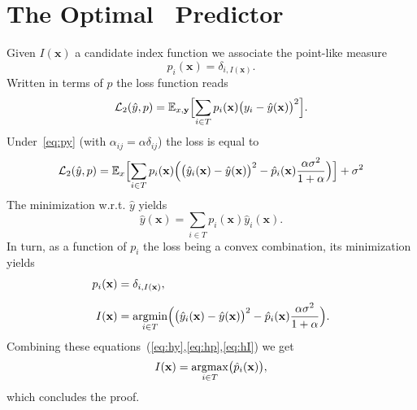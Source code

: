\chapter{The Optimal \XX \ Predictor}\label{app:opred}
Given $I(\mathbf{x})$ a candidate index function we associate the point-like measure
\[
p_i(\mathbf{x}) = \delta_{i,I(\mathbf{x})}.
\]
Written in terms of $p$ the loss function reads
\[
{\cal L}_2(\hat y,p) = {\mathbb E}_{x,{\bf y}}\Bigl[\sum_{i\in T} p_i(\mathbf{x})\bigl(y_i-\hat y(\mathbf{x})\bigr)^2\Bigr].
\]
Under~\cref{eq:py} (with $\alpha_{ij}=\alpha\delta_{ij}$) the loss is equal to
\[
{\cal L}_2(\hat y,p) = {\mathbb E}_x\Bigl[\sum_{i\in T} p_i(\mathbf{x})\Bigl( \bigl(\hat y_i(\mathbf{x})-\hat y(\mathbf{x})\bigr)^2-\hat p_i(\mathbf{x})\frac{\alpha\sigma^2}{1+\alpha}\Bigr)\Bigr]+\sigma^2
\]
The minimization w.r.t. $\hat y$ yields
\begin{equation}\label{eq:hy}
\hat y(\mathbf{x}) = \sum_{i\in T} p_i(\mathbf{x})\hat y_i(\mathbf{x}).
\end{equation}
In turn, as a function of $p_i$ the loss being a  convex combination, its minimization yields
\begin{align}
  p_i(\mathbf{x}) &= \delta_{i,I(\mathbf{x})},\label{eq:hp}\\[0.2cm]
  I(\mathbf{x}) &= \operatorname*{argmin}_{i\in T}\Bigl(\bigl(\hat y_i(\mathbf{x})-\hat y(\mathbf{x})\bigr)^2-\hat p_i(\mathbf{x})\frac{\alpha\sigma^2}{1+\alpha}\Bigr).\label{eq:hI}
\end{align}
Combining these equations~(\ref{eq:hy},\ref{eq:hp},\ref{eq:hI}) we get
\[
I(\mathbf{x}) = \operatorname*{argmax}_{i\in T}\bigl(\hat p_i(\mathbf{x})\bigr),
\]
which concludes the proof.  
